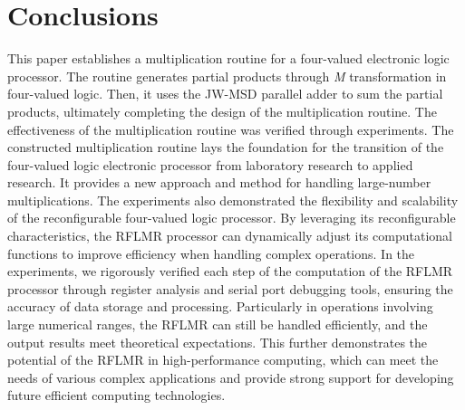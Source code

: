 \documentclass[electronics,article,accept,pdftex,moreauthors]{Definitions/mdpi}
\begin{document}
\section{Conclusions}
This paper establishes a multiplication routine for a four-valued electronic logic processor. The routine generates partial products through \textit{M} transformation in four-valued logic. Then, it uses the JW-MSD parallel adder to sum the partial products, ultimately completing the design of the multiplication routine. The effectiveness of the multiplication routine was verified through experiments. The constructed multiplication routine lays the foundation for the transition of the four-valued logic electronic processor from laboratory research to applied research. It provides a new approach and method for handling large-number multiplications. The experiments also demonstrated the flexibility and scalability of the reconfigurable four-valued logic processor. By leveraging its reconfigurable characteristics, the RFLMR processor can dynamically adjust its computational functions to improve efficiency when handling complex operations. In the experiments, we rigorously verified each step of the computation of the RFLMR processor through register analysis and serial port debugging tools, ensuring the accuracy of data storage and processing. Particularly in operations involving large numerical ranges, the RFLMR can still be handled efficiently, and the output results meet theoretical expectations. This further demonstrates the potential of the RFLMR in high-performance computing, which can meet the needs of various complex applications and provide strong support for developing future efficient computing technologies.


\end{document}
